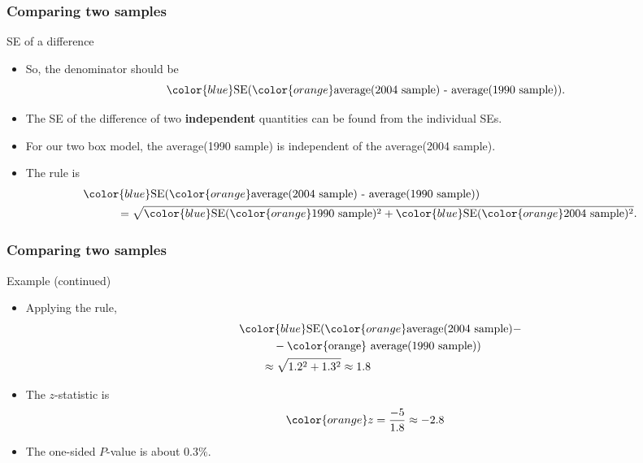 \documentclass[handout]{beamer}
\begin{document}
   \begin{frame} \frametitle{Comparing two samples}

   \begin{block}
   {SE of a difference}
   \begin{itemize}



   \item So, the denominator should be
   $$
   {\color{blue} \text{SE}}({\color{orange} \text{average(2004 sample) -
   average(1990 sample)}}).
   $$

   \item The SE of the difference of two {\bf independent}
   quantities can be found from the individual SEs.

   \item For our two box model, the {\color{orange} average(1990 sample)}
   is independent of the {\color{orange} average(2004 sample)}.

   \item The rule is
   $$
   \begin{aligned}
   \lefteqn{{\color{blue} \text{SE}}({\color{orange}
   \text{average(2004 sample) -
   average(1990 sample)}})} \\
   & \qquad \quad = \sqrt{{\color{blue}\text{SE}}({\color{orange} \text{1990 sample}})^2 + {\color{blue}\text{SE}}({\color{orange} \text{2004 sample}})^2}.
   \end{aligned}
   $$


   \end{itemize}
   \end{block}
   \end{frame}


   \begin{frame} \frametitle{Comparing two samples}

   \begin{block}
   {Example (continued)}
   \begin{itemize}

   \item Applying the rule,
   $$
   \begin{aligned}
   \lefteqn{ {\color{blue} \text{SE}}({\color{orange}
   \text{average(2004 sample)} -}} \\
   & \qquad \quad - \text{\color{orange}  average(1990 sample)})  \\
   & \qquad \approx \sqrt{1.2^2+1.3^2} \approx 1.8
   \end{aligned}
   $$
   \item The $z$-statistic is
   $$
   {\color{orange} z} = \frac{-5}{1.8} \approx -2.8
   $$

   \item The one-sided $P$-value is about $0.3\%$.

   \end{itemize}
   \end{block}
   \end{frame}
\end{document}
